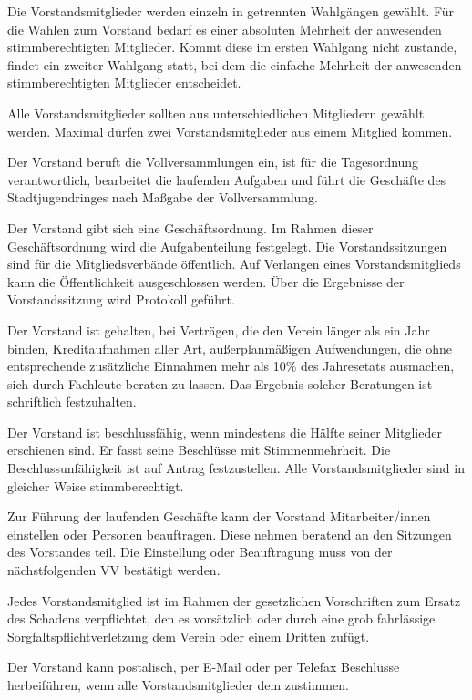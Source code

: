 \documentclass[10pt,a4paper,oneside,parskip=half]{scrartcl}
\begin{document}
\begin{contract}
Die Vorstandsmitglieder werden einzeln in getrennten Wahlgängen gewählt. Für die Wahlen zum Vorstand bedarf es einer absoluten Mehrheit der anwesenden stimmberechtigten Mitglieder. Kommt diese im ersten Wahlgang nicht zustande, findet ein zweiter Wahlgang statt, bei dem die einfache Mehrheit der anwesenden stimmberechtigten Mitglieder entscheidet.

Alle Vorstandsmitglieder sollten aus unterschiedlichen Mitgliedern gewählt werden. Maximal dürfen zwei Vorstandsmitglieder aus einem Mitglied kommen.

Der Vorstand beruft die Vollversammlungen ein, ist für die Tagesordnung verantwortlich, bearbeitet die laufenden Aufgaben und führt die Geschäfte des Stadtjugendringes nach Maßgabe der Vollversammlung.

Der Vorstand gibt sich eine Geschäftsordnung. Im Rahmen dieser Geschäftsordnung wird die Aufgabenteilung festgelegt. Die Vorstandssitzungen sind für die Mitgliedsverbände öffentlich. Auf Verlangen eines Vorstandsmitglieds kann die Öffentlichkeit ausgeschlossen werden. Über die Ergebnisse der Vorstandssitzung wird Protokoll geführt.

Der Vorstand ist gehalten, bei Verträgen, die den Verein länger als ein Jahr binden, Kreditaufnahmen aller Art, außerplanmäßigen Aufwendungen, die ohne entsprechende zusätzliche Einnahmen mehr als 10\% des Jahresetats ausmachen, sich durch Fachleute beraten zu lassen. Das Ergebnis solcher Beratungen ist schriftlich festzuhalten.

Der Vorstand ist beschlussfähig, wenn mindestens die Hälfte seiner Mitglieder erschienen sind. Er fasst seine Beschlüsse mit Stimmenmehrheit. Die Beschlussunfähigkeit ist auf Antrag festzustellen. Alle Vorstandsmitglieder sind in gleicher Weise stimmberechtigt.

Zur Führung der laufenden Geschäfte kann der Vorstand Mitarbeiter/innen einstellen oder Personen beauftragen. Diese nehmen beratend an den Sitzungen des Vorstandes teil. Die Einstellung oder Beauftragung muss von der nächstfolgenden VV bestätigt werden.

Jedes Vorstandsmitglied ist im Rahmen der gesetzlichen Vorschriften zum Ersatz des Schadens verpflichtet, den es vorsätzlich oder durch eine grob fahrlässige Sorgfaltspflichtverletzung dem Verein oder einem Dritten zufügt.

Der Vorstand kann postalisch, per E-Mail oder per Telefax Beschlüsse herbeiführen, wenn alle Vorstandsmitglieder dem zustimmen.


\end{contract}
\end{document}
